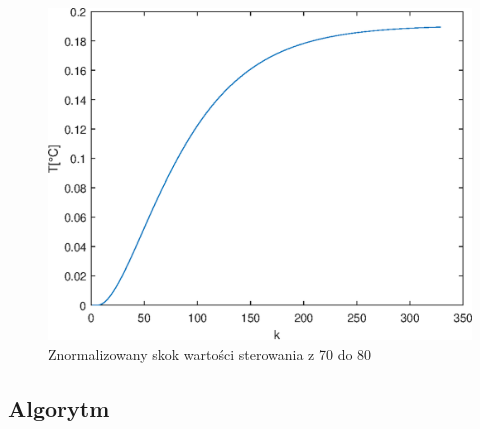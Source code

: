 \begin{figure}[h!]
	\centering
	\includegraphics[scale=1]{Rys/Skok7080_approx.eps}
	\caption{Znormalizowany skok wartości sterowania z \num{70} do \num{80}}
	\label{skokn3}
\end{figure}

\FloatBarrier


\subsection {Algorytm}

